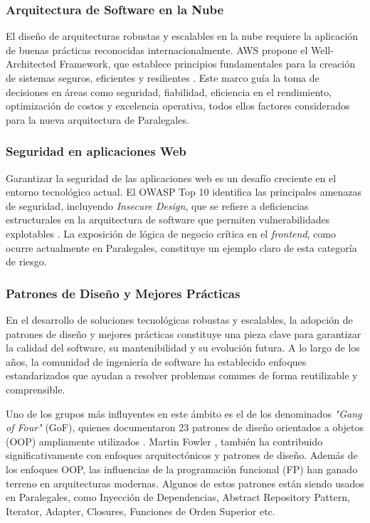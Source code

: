 \subsubsection{Arquitectura de Software en la Nube}

El diseño de arquitecturas robustas y escalables en la nube requiere la aplicación de buenas prácticas reconocidas internacionalmente. AWS propone el Well-Architected Framework, que establece principios fundamentales para la creación de sistemas seguros, eficientes y resilientes \cite{AWS2024}. Este marco guía la toma de decisiones en áreas como seguridad, fiabilidad, eficiencia en el rendimiento, optimización de costos y excelencia operativa, todos ellos factores considerados para la nueva arquitectura de Paralegales.

\subsubsection{Seguridad en aplicaciones Web}

Garantizar la seguridad de las aplicaciones web es un desafío creciente en el entorno tecnológico actual. El OWASP Top 10 identifica las principales amenazas de seguridad, incluyendo \textit{Insecure Design}, que se refiere a deficiencias estructurales en la arquitectura de software que permiten vulnerabilidades explotables \cite{OWASP2021}. La exposición de lógica de negocio crítica en el \textit{frontend}, como ocurre actualmente en Paralegales, constituye un ejemplo claro de esta categoría de riesgo.

\subsubsection{Patrones de Diseño y Mejores Prácticas}

En el desarrollo de soluciones tecnológicas robustas y escalables, la adopción de patrones de diseño y mejores prácticas constituye una pieza clave para garantizar la calidad del software, su mantenibilidad y su evolución futura. A lo largo de los años, la comunidad de ingeniería de software ha establecido enfoques estandarizados que ayudan a resolver problemas comunes de forma reutilizable y comprensible.

Uno de los grupos más influyentes en este ámbito es el de los denominados \textit{"Gang of Four"} (GoF), quienes documentaron 23 patrones de diseño orientados a objetos (OOP) ampliamente utilizados \cite{Gamma1994}. Martin Fowler \cite{Fowler2002}, también ha contribuido significativamente con enfoques arquitectónicos y patrones de diseño. Además de los enfoques OOP, las influencias de la programación funcional (FP) han ganado terreno en arquitecturas modernas. Algunos de estos patrones están siendo usados en Paralegales, como Inyección de Dependencias, Abstract Repository Pattern, Iterator, Adapter, Closures, Funciones de Orden Superior etc.

